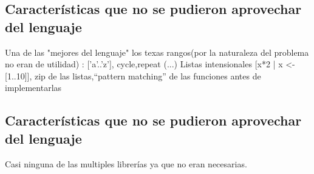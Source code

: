 \documentclass[12pt,a4paper]{article}
\begin{document}
       \subsection{Características que no se pudieron aprovechar del lenguaje}
       Una de las "mejores del lenguaje" los texas rangos(por la naturaleza del problema no eran de utilidad) : ['a'..'z'], cycle,repeat (...) Listas intensionales [x*2 | x <- [1..10]], zip de las listas,“pattern matching” de las funciones antes de implementarlas



\subsection{Características que no se pudieron aprovechar del lenguaje}
Casi ninguna de las multiples librerías ya que no eran necesarias.
\end{document}
